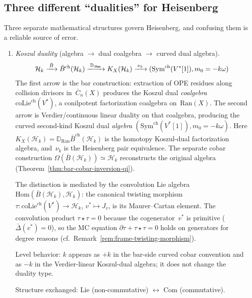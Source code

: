 \subsection{Three different ``dualities'' for Heisenberg}\label{thm:three-dualities-compared}

Three separate mathematical structures govern Heisenberg, and
confusing them is a reliable source of error.

\begin{enumerate}
\item \emph{Koszul duality} (algebra $\to$ dual coalgebra $\to$ curved dual algebra).
 \[
 \mathcal{H}_k \xrightarrow{\;\bar{B}\;}
 \bar{B}^{\mathrm{ch}}(\mathcal{H}_k)
 \xrightarrow{\;\mathbb D_{\Ran}\;}
 K_X(\mathcal H_k)
 \xrightarrow{\;\nu_k\;}
 (\mathrm{Sym}^{\mathrm{ch}}(V^*[1]),m_0=-k\omega)
 \]
 The first arrow is the bar construction: extraction of OPE residues
 along collision divisors in~$\overline{C}_n(X)$ produces the Koszul
 dual \emph{coalgebra}~$\mathrm{coLie}^{\mathrm{ch}}(V^*)$, a
 conilpotent factorization coalgebra on~$\mathrm{Ran}(X)$. The
 second arrow is Verdier/continuous linear duality on that coalgebra,
 producing the curved second-kind Koszul dual \emph{algebra}
 $(\mathrm{Sym}^{\mathrm{ch}}(V^*[1]),m_0=-k\omega)$.
 Here
 $K_X(\mathcal H_k)=
 \mathbb{D}_{\operatorname{Ran}}\bar{B}^{\mathrm{ch}}(\mathcal{H}_k)$
 is the homotopy Koszul-dual factorization algebra, and~$\nu_k$ is the
 Heisenberg pair equivalence.  The separate cobar construction
 $\Omega(\bar{B}(\mathcal{H}_k))\simeq\mathcal{H}_k$ reconstructs the
 original algebra (Theorem~\ref{thm:bar-cobar-inversion-qi}).

 The distinction is mediated by the convolution Lie algebra
 $\mathrm{Hom}(\bar{B}(\mathcal{H}_k), \mathcal{H}_k)$: the
 canonical twisting morphism
 $\tau \colon \mathrm{coLie}^{\mathrm{ch}}(V^*) \to \mathcal{H}_k$,
 $v^* \mapsto J_v$, is its Maurer--Cartan element. The convolution
 product $\tau \star \tau = 0$ because the cogenerator~$v^*$ is
 primitive ($\bar{\Delta}(v^*) = 0$), so the MC equation
 $\partial\tau + \tau \star \tau = 0$ holds on generators for
 degree reasons
 (cf.~Remark~\ref{rem:frame-twisting-morphism}).

 Level behavior: $k$ appears as $+k$ in the bar-side curved cobar
 convention and as $-k$ in the Verdier-linear Koszul-dual algebra;
 it does not change the duality type.

 Structure exchanged: Lie (non-commutative) $\leftrightarrow$ Com (commutative).


\end{enumerate}
